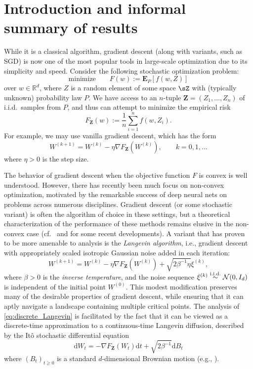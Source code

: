 \documentclass[final,12pt]{colt2018}
\numberwithin{equation}{section}
\numberwithin{equation}{section}
\def\Reals{\mathbb{R}}
\def\deq{:=}
\def\bd#1{\mathbf{#1}}
\def\bZ{\bd{Z}}
\begin{document}
\section{Introduction and informal summary of results}
While it is a classical algorithm, gradient descent (along with variants, such as SGD) is now one of the most popular tools in large-scale optimization due to its simplicity and speed. 
Consider the following stochastic optimization problem:
\begin{equation*}%
\text{minimize} \qquad  F(w) \deq \mathbf{E}_P[f(w,Z)]
\end{equation*}
over $w \in \Reals^d$, where $Z$ is a random element of some space $\sZ$ with (typically unknown) probability law $P$.  We have access to an $n$-tuple $\bZ = (Z_1,\ldots,Z_n)$ of i.i.d.\ samples from $P$, and thus can attempt to minimize the empirical risk
\begin{equation*}%
F_{\mathbf{\bZ}}(w) \deq \frac{1}{n}\sum_{i=1}^n f(w,Z_i).
\end{equation*}
For example, we may use vanilla gradient descent, which has the form
\begin{equation*}%
W^{(k+1)} = W^{(k)} - \eta\nabla F_{\bZ}(W^{(k)}), \qquad k = 0,1,\ldots
\end{equation*}
where $\eta > 0$ is the step size.

The behavior of gradient descent when the objective function $F$ is convex is well understood.  However, there has recently been much focus on non-convex optimization, motivated by the remarkable success of deep neural nets on problems across numerous disciplines. Gradient descent (or some stochastic variant) is often the algorithm of choice in these settings, but a theoretical characterization of the performance of these methods remains elusive in the non-convex case (cf.\ \cite{natasha,natasha2} and \cite{carmon2017} for some recent developments).
A variant that has proven to be more amenable to analysis is the \textit{Langevin algorithm}, i.e., gradient descent with appropriately scaled isotropic Gaussian noise added in each iteration:  
\begin{equation}\label{eq:discrete_Langevin}
W^{(k+1)} = W^{(k)} - \eta\nabla F_{\bZ}(W^{(k)}) + \sqrt{2\beta^{-1}\eta}\xi^{(k)},
\end{equation}
where $\beta > 0$ is the \textit{inverse temperature}, and the noise sequence $\xi^{(k)} \stackrel{{\rm i.i.d.}}{\sim}\mathcal{N}(0,I_d)$ is independent of the initial point $W^{(0)}$. This modest modification  preserves many of the desirable properties of gradient descent, while ensuring that it can aptly navigate a landscape containing multiple critical points.  The analysis of \eqref{eq:discrete_Langevin} is facilitated by the fact that it can be viewed as a discrete-time approximation to a continuous-time Langevin diffusion, described by the It\^o stochastic differential equation
\begin{equation}\label{eq:Langevin}
\mathrm{d}W_t = -\nabla F_{\bZ}(W_t)\mathrm{d}t + \sqrt{2\beta^{-1}}\mathrm{d}B_t
\end{equation}
where $(B_t)_{t\geq 0}$ is a standard $d$-dimensional Brownian motion (e.g., \cite{borkar1999strong}). 
\end{document}
